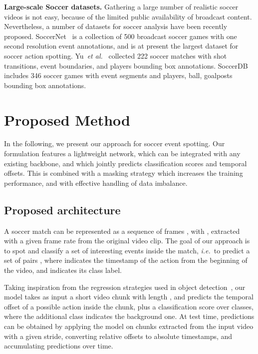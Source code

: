 \documentclass[a4paper,conference]{IEEEtran}
\newcommand{\tit}[1]{\smallbreak\noindent\textbf{#1.}}
\def \ie {\emph{i.e.}}
\def \etal {\emph{et al.}}
\begin{document}
\tit{Large-scale Soccer datasets}
Gathering a large number of realistic soccer videos is not easy, because of the limited public availability of broadcast content. Nevertheless, a number of datasets for soccer analysis have been recently proposed. SoccerNet~\cite{giancola2018soccernet} is a collection of 500 broadcast soccer games with one second resolution event annotations, and is at present the largest dataset for soccer action spotting. Yu~\etal~\cite{yu2018comprehensive} collected 222 soccer matches with shot transitions, event boundaries, and players bounding box annotations. SoccerDB~\cite{wang2019comprehensive} includes 346 soccer games with event segments and players, ball, goalposts bounding box annotations.

\section{Proposed Method}
In the following, we present our approach for soccer event spotting. Our formulation features a lightweight network, which can be integrated with any existing backbone, and which jointly predicts classification scores and temporal offsets. This is combined with a masking strategy which increases the training performance, and with effective handling of data imbalance.

\subsection{Proposed architecture}

A soccer match can be represented as a sequence of frames , with , extracted with a given frame rate from the original video clip. The goal of our approach is to spot and classify a set of interesting events inside the match, \ie~to predict a set of pairs , where  indicates the timestamp of the action from the beginning of the video, and  indicates its class label.



Taking inspiration from the regression strategies used in object detection~\cite{ren2015faster}, our model takes as input a short video chunk  with length , and predicts the temporal offset of a possible action inside the chunk, plus a classification score over  classes, where the additional class indicates the background one. At test time, predictions can be obtained by applying the model on chunks extracted from the input video with a given stride, converting relative offsets to absolute timestamps, and accumulating predictions over time.
\end{document}
